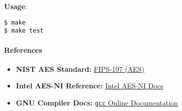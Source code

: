 \textbf{Usage}:
\begin{verbatim}
$ make
$ make test
\end{verbatim}

\paragraph{References}

\begin{itemize}
	\item \textbf{NIST AES Standard:} \href{https://nvlpubs.nist.gov/nistpubs/FIPS/NIST.FIPS.197.pdf}{FIPS-197 (AES)}
	\item \textbf{Intel AES-NI Reference:} \href{https://www.intel.com/content/www/us/en/developer/articles/technical/intel-advanced-encryption-standard-aes-instructions-set.html}{Intel AES-NI Docs}
	\item \textbf{GNU Compiler Docs:} \href{https://gcc.gnu.org/onlinedocs/}{\texttt{gcc} Online Documentation}
\end{itemize}